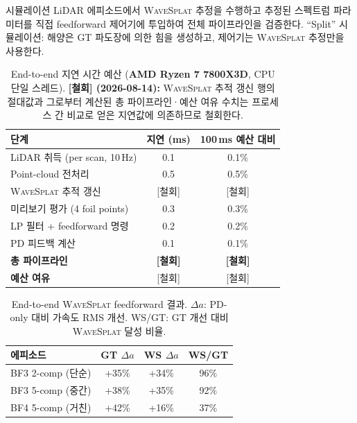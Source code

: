 \documentclass[11pt]{report}
\numberwithin{equation}{chapter}
\numberwithin{figure}{chapter}
\numberwithin{table}{chapter}
\newcommand{\WS}{\textsc{WaveSplat}}
\begin{document}
시뮬레이션 LiDAR 에피소드에서 \WS{} 추정을 수행하고 추정된 스펙트럼 파라미터를
직접 feedforward 제어기에 투입하여 전체 파이프라인을 검증한다.
``Split'' 시뮬레이션: 해양은 GT 파도장에 의한 힘을 생성하고,
제어기는 \WS{} 추정만을 사용한다.

\begin{table}[htbp]
\centering
\caption{End-to-end 지연 시간 예산 (\textbf{AMD Ryzen 7 7800X3D}, CPU 단일 스레드).
\textbf{[철회] (2026-08-14):} \WS{} 추적 갱신 행의 절대값과 그로부터 계산된
총 파이프라인·예산 여유 수치는 프로세스 간 비교로 얻은 지연값에 의존하므로 철회한다.}
\label{tab:latency}
\begin{tabular}{lcc}
\toprule
단계 & 지연 (ms) & 100\,ms 예산 대비 \\
\midrule
LiDAR 취득 (per scan, 10\,Hz) & 0.1 & 0.1\% \\
Point-cloud 전처리            & 0.5 & 0.5\% \\
\WS{} 추적 갱신            & [철회] & [철회] \\
미리보기 평가 (4 foil points)   & 0.3 & 0.3\% \\
LP 필터 + feedforward 명령      & 0.2 & 0.2\% \\
PD 피드백 계산              & 0.1 & 0.1\% \\
\midrule
\textbf{총 파이프라인}              & \textbf{[철회]} & \textbf{[철회]} \\
\textbf{예산 여유}               & [철회] & [철회] \\
\bottomrule
\end{tabular}
\end{table}

\begin{table}[htbp]
\centering
\caption{End-to-end \WS{} feedforward 결과.
$\Delta a$: PD-only 대비 가속도 RMS 개선. WS/GT: GT 개선 대비 \WS{} 달성 비율.}
\label{tab:e2e}
\begin{tabular}{lccc}
\toprule
에피소드 & GT $\Delta a$ & WS $\Delta a$ & WS/GT \\
\midrule
BF3 2-comp (단순)   & +35\% & +34\% & 96\% \\
BF3 5-comp (중간) & +38\% & +35\% & 92\% \\
BF4 5-comp (거친)    & +42\% & +16\% & 37\% \\
\bottomrule
\end{tabular}
\end{table}
\end{document}
